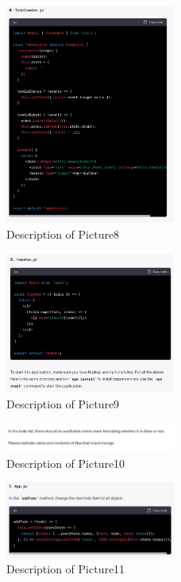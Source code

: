 \documentclass[runningheads]{llncs}
\begin{document}
\begin{figure}[h]
    \centering
    \includegraphics[width=0.5\textwidth]{Pictures/Picture8.jpg}
    \caption{Description of Picture8}
    \label{fig:picture8}
\end{figure}
\begin{figure}[h]
    \centering
    \includegraphics[width=0.5\textwidth]{Pictures/Picture9.jpg}
    \caption{Description of Picture9}
    \label{fig:picture9}
\end{figure}
\begin{figure}[h]
    \centering
    \includegraphics[width=0.5\textwidth]{Pictures/Picture10.jpg}
    \caption{Description of Picture10}
    \label{fig:picture10}
\end{figure}
\begin{figure}[h]
    \centering
    \includegraphics[width=0.5\textwidth]{Pictures/Picture11.jpg}
    \caption{Description of Picture11}
    \label{fig:picture11}
\end{figure}
\end{document}
